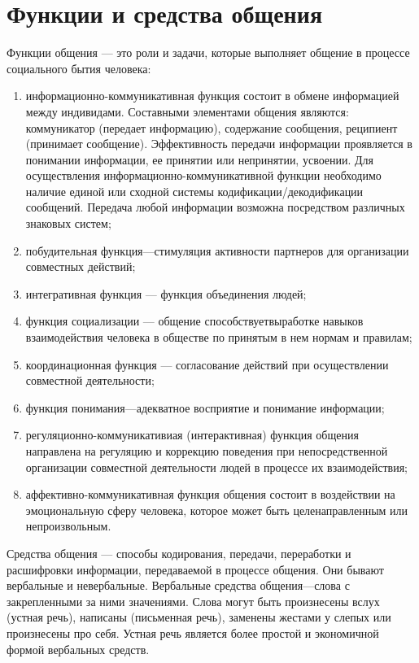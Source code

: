 \section{Функции и средства общения}
Функции общения — это роли и задачи, которые выполняет общение в процессе социального бытия человека:  \cite{28}
\begin{enumerate}
	\item информационно-коммуникативная функция состоит в обмене информацией между индивидами. Составными элементами общения являются: коммуникатор (передает информацию), содержание сообщения, реципиент (принимает сообщение). Эффективность передачи информации проявляется в понимании информации, ее принятии или непринятии, усвоении. Для осуществления информационно-коммуникативной функции необходимо наличие единой или сходной системы кодификации/декодификации сообщений. Передача любой информации возможна посредством различных знаковых систем;
	\item побудительная функция—стимуляция активности партнеров для организации совместных действий;
	\item интегративная функция — функция объединения людей;
	\item функция социализации — общение способствуетвыработке навыков взаимодействия человека в обществе по принятым в нем нормам и правилам;
	\item координационная функция — согласование действий при осуществлении совместной деятельности;
	\item функция понимания—адекватное восприятие и понимание информации;
	\item регуляционно-коммуникативиая (интерактивная) функция общения направлена на регуляцию и коррекцию поведения при непосредственной организации совместной деятельности людей в процессе их взаимодействия;
	\item аффективно-коммуникативная функция общения состоит в воздействии на эмоциональную сферу человека, которое может быть целенаправленным или непроизвольным. 
\end{enumerate}

Средства общения — способы кодирования, передачи, переработки и расшифровки информации, передаваемой в процессе общения. Они бывают вербальные и невербальные. Вербальные средства общения—слова с закрепленными за ними значениями. Слова могут быть произнесены вслух (устная речь), написаны (письменная речь), заменены жестами у слепых или произнесены про себя. Устная речь является более простой и экономичной формой вербальных средств.

